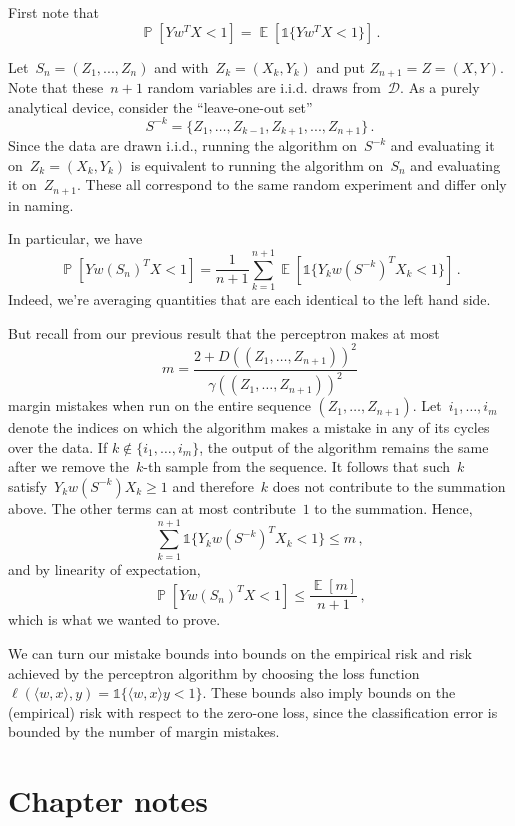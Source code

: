 \documentclass{tufte-book}
\begin{document}
\begin{Proof}

First note that \[
\mathop\mathbb{P}[Y w^T X < 1] = \mathop\mathbb{E}[\mathbb{1}\{Yw^T X < 1\}]\,.
\]

Let~\(S_n=(Z_1, ... , Z_n)\) and with~\(Z_k=(X_k, Y_k)\) and put
\(Z_{n+1}=Z=(X,Y)\). Note that these~\(n+1\) random variables are i.i.d.
draws from~\(\mathcal{D}.\) As a purely analytical device, consider the
``leave-one-out set'' \[
S^{-k}=\{Z_1,\dots,Z_{k-1},Z_{k+1},...,Z_{n+1}\}\,.
\] Since the data are drawn i.i.d., running the algorithm on~\(S^{-k}\)
and evaluating it on~\(Z_k=(X_k,Y_k)\) is equivalent to running the
algorithm on~\(S_n\) and evaluating it on~\(Z_{n+1}\). These all
correspond to the same random experiment and differ only in naming.

In particular, we have \[
\mathop\mathbb{P}[Y w(S_n)^T X < 1]
= \frac1{n+1}\sum_{k=1}^{n+1} \mathop\mathbb{E}[\mathbb{1}\{Y_k w(S^{-k})^T X_k < 1\}]\,.
\] Indeed, we're averaging quantities that are each identical to the
left hand side.

But recall from our previous result that the perceptron makes at most \[
m=\frac{2+D((Z_1,\dots,Z_{n+1}))^2}{\gamma((Z_1,\dots,Z_{n+1}))^2}
\] margin mistakes when run on the entire sequence
\((Z_1,\dots,Z_{n+1})\). Let~\(i_1,\dots,i_m\) denote the indices on
which the algorithm makes a mistake in any of its cycles over the data.
If \(k\not\in\{i_1,\dots,i_m\}\), the output of the algorithm remains
the same after we remove the~\(k\)-th sample from the sequence. It
follows that such~\(k\) satisfy~\(Y_k w(S^{-k})X_k \geq 1\) and
therefore~\(k\) does not contribute to the summation above. The other
terms can at most contribute~\(1\) to the summation. Hence, \[
\sum_{k=1}^{n+1}\mathbb{1}\{Y_k w(S^{-k})^T X_k < 1\} \le m\,,
\] and by linearity of expectation, \[
\mathop\mathbb{P}[Y w(S_n)^T X < 1] \le \frac{\mathop\mathbb{E}[m]}{n+1}\,,
\] which is what we wanted to prove.

\end{Proof}

We can turn our mistake bounds into bounds on the empirical risk and
risk achieved by the perceptron algorithm by choosing the loss function
\(\ell(\langle w, x\rangle, y)= \mathbb{1}\{ \langle w, x\rangle y < 1\}\).
These bounds also imply bounds on the (empirical) risk with respect to
the zero-one loss, since the classification error is bounded by the
number of margin mistakes.

\hypertarget{chapter-notes-2}{%
\section{Chapter notes}\label{chapter-notes-2}}
\end{document}
